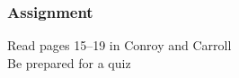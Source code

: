 \documentclass[color=usenames,dvipsnames]{beamer}\usepackage[]{graphicx}\usepackage[]{color}
\begin{document}
%  




\begin{frame}
  \frametitle{Assignment}
  \Large
  Read pages 15--19 in Conroy and Carroll \\
  \vspace{1cm}
  Be prepared for a quiz \\
\end{frame}
\end{document}
